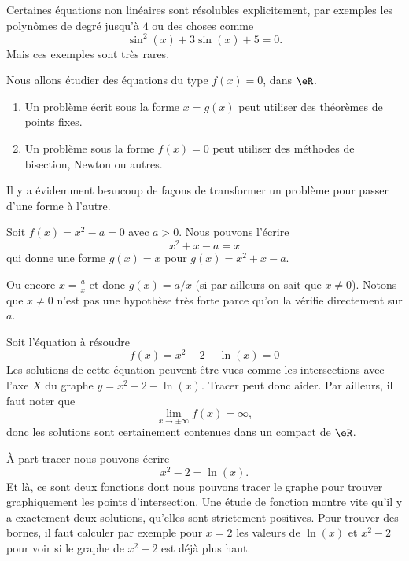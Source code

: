 Certaines équations non linéaires sont résolubles explicitement, par exemples les polynômes de degré jusqu'à \( 4\) ou des choses comme
\begin{equation}
	\sin^2(x)+3\sin(x)+5=0.
\end{equation}
Mais ces exemples sont très rares.

Nous allons étudier des équations du type \( f(x)=0\), dans \( \eR\).

\begin{enumerate}
	\item
	      Un problème écrit sous la forme \( x=g(x)\) peut utiliser des théorèmes de points fixes.
	\item
	      Un problème sous la forme \( f(x)=0\) peut utiliser des méthodes de bisection, Newton ou autres.
\end{enumerate}
Il y a évidemment beaucoup de façons de transformer un problème pour passer d'une forme à l'autre.

\begin{example}
	Soit \( f(x)=x^2-a=0\) avec \( a>0\). Nous pouvons l'écrire
	\begin{equation}
		x^2+x-a=x
	\end{equation}
	qui donne une forme \( g(x)=x\) pour \( g(x)=x^2+x-a\).

	Ou encore \( x=\frac{ a }{ x }\) et donc \( g(x)=a/x\) (si par ailleurs on sait que \( x\neq 0\)). Notons que \( x\neq 0\) n'est pas une hypothèse très forte parce qu'on la vérifie directement sur \( a\).
\end{example}

\begin{example}
	Soit l'équation à résoudre
	\begin{equation}
		f(x)=x^2-2-\ln(x)=0
	\end{equation}
	Les solutions de cette équation peuvent être vues comme les intersections avec l'axe \( X\) du graphe \( y=x^2-2-\ln(x)\). Tracer peut donc aider. Par ailleurs, il faut noter que
	\begin{equation}
		\lim_{x\to \pm\infty} f(x)=\infty,
	\end{equation}
	donc les solutions sont certainement contenues dans un compact de \( \eR\).

	À part tracer nous pouvons écrire
	\begin{equation}
		x^2-2=\ln(x).
	\end{equation}
	Et là, ce sont deux fonctions dont nous pouvons tracer le graphe pour trouver graphiquement les points d'intersection. Une étude de fonction montre vite qu'il y a exactement deux solutions, qu'elles sont strictement positives. Pour trouver des bornes, il faut calculer par exemple pour \( x=2\) les valeurs de \( \ln(x)\) et \( x^2-2\) pour voir si le graphe de \( x^2-2\) est déjà plus haut.
\end{example}

